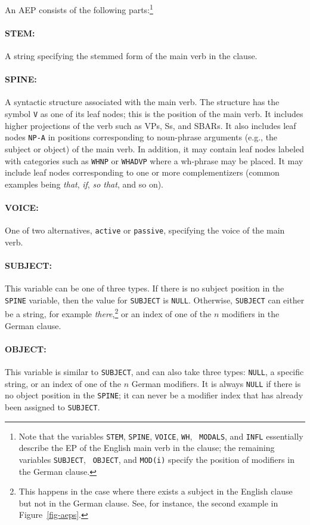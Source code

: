 \documentclass[10pt]{report}
\theoremstyle{plain}
\begin{document}
{An AEP consists of the following parts:\footnote{Note that the
variables {\tt STEM}, {\tt SPINE}, {\tt VOICE}, {\tt WH}, {\tt
MODALS}, and {\tt INFL} essentially describe the EP of the English
main verb in the clause; the remaining variables {\tt SUBJECT}, {\tt
OBJECT}, and {\tt MOD(i)} specify the position of modifiers in the
German clause.}

\paragraph{STEM:} A string specifying the stemmed form of the
main verb in the clause.

\paragraph{SPINE:} A syntactic structure associated with the main verb. 
  The structure has the symbol {\tt V} as one of its leaf nodes; this
  is the position of the main verb. It includes higher projections of
  the verb such as VPs, Ss, and SBARs. It also includes leaf nodes
  {\tt NP-A} in positions corresponding to noun-phrase arguments
  (e.g., the subject or object) of the main verb. In addition, it may
  contain leaf nodes labeled with categories such as {\tt WHNP} or
  {\tt WHADVP} where a wh-phrase may be placed. It may include leaf
  nodes corresponding to one or more complementizers (common examples
  being {\em that}, {\em if}, {\em so that}, and so on).

\paragraph{VOICE:} One of two alternatives, {\tt active} or 
{\tt passive}, specifying the voice of the main verb.

\paragraph{SUBJECT:} This variable can be one of three types. If there
is no subject position in the {\tt SPINE} variable, then the value for
{\tt SUBJECT} is {\tt NULL}. Otherwise, {\tt SUBJECT} can either be a
string, for example {\em there},\footnote{This happens in the case
where there exists a subject in the English clause but not in the
German clause. See, for instance, the second example in
Figure~\ref{fig-aeps}.} or an index of one of the $n$ modifiers in the
German clause.

\paragraph{OBJECT:} This variable is similar to {\tt SUBJECT}, and can
also take three types: {\tt NULL}, a specific string, or an index of
one of the $n$ German modifiers. It is always {\tt NULL} if there is
no object position in the {\tt SPINE}; it can never be a modifier
index that has already been assigned to {\tt SUBJECT}.

}
\end{document}
